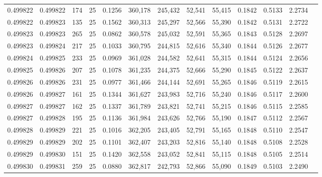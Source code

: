 \begin{tabular}{rrrrrrrrrrrrr}
0.499822 & 0.499822 & 174 &  25 &                                     0.1256 & 360,178 & 245,432 &  52,541 &  55,415 & 0.1842 & 0.5133 & 2.2734 \\
0.499822 & 0.499823 & 135 &  25 &                                     0.1562 & 360,313 & 245,297 &  52,566 &  55,390 & 0.1842 & 0.5131 & 2.2722 \\
0.499823 & 0.499823 & 265 &  25 &                                     0.0862 & 360,578 & 245,032 &  52,591 &  55,365 & 0.1843 & 0.5128 & 2.2697 \\
0.499823 & 0.499824 & 217 &  25 &                                     0.1033 & 360,795 & 244,815 &  52,616 &  55,340 & 0.1844 & 0.5126 & 2.2677 \\
0.499824 & 0.499825 & 233 &  25 &                                     0.0969 & 361,028 & 244,582 &  52,641 &  55,315 & 0.1844 & 0.5124 & 2.2656 \\
0.499825 & 0.499826 & 207 &  25 &                                     0.1078 & 361,235 & 244,375 &  52,666 &  55,290 & 0.1845 & 0.5122 & 2.2637 \\
0.499826 & 0.499826 & 231 &  25 &                                     0.0977 & 361,466 & 244,144 &  52,691 &  55,265 & 0.1846 & 0.5119 & 2.2615 \\
0.499826 & 0.499827 & 161 &  25 &                                     0.1344 & 361,627 & 243,983 &  52,716 &  55,240 & 0.1846 & 0.5117 & 2.2600 \\
0.499827 & 0.499827 & 162 &  25 &                                     0.1337 & 361,789 & 243,821 &  52,741 &  55,215 & 0.1846 & 0.5115 & 2.2585 \\
0.499827 & 0.499828 & 195 &  25 &                                     0.1136 & 361,984 & 243,626 &  52,766 &  55,190 & 0.1847 & 0.5112 & 2.2567 \\
0.499828 & 0.499829 & 221 &  25 &                                     0.1016 & 362,205 & 243,405 &  52,791 &  55,165 & 0.1848 & 0.5110 & 2.2547 \\
0.499829 & 0.499829 & 202 &  25 &                                     0.1101 & 362,407 & 243,203 &  52,816 &  55,140 & 0.1848 & 0.5108 & 2.2528 \\
0.499829 & 0.499830 & 151 &  25 &                                     0.1420 & 362,558 & 243,052 &  52,841 &  55,115 & 0.1848 & 0.5105 & 2.2514 \\
0.499830 & 0.499831 & 259 &  25 &                                     0.0880 & 362,817 & 242,793 &  52,866 &  55,090 & 0.1849 & 0.5103 & 2.2490 \\

\end{tabular}
